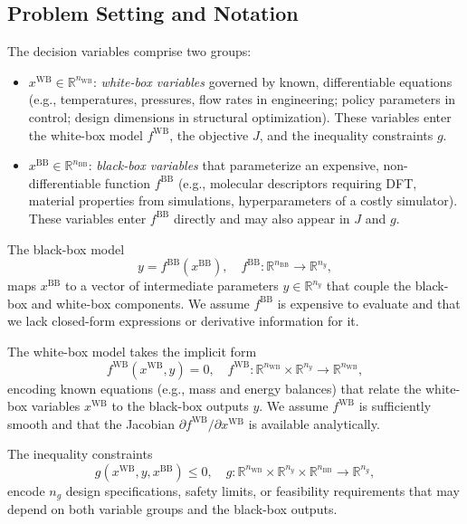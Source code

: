 \documentclass[12pt,a4paper]{article}%
\theoremstyle{plain}%
\theoremstyle{remark}%
\theoremstyle{definition}%
\def\WB{\mathrm{WB}}
\def\BB{\mathrm{BB}}
\begin{document}
\subsection{Problem Setting and Notation}\label{subsec:problem_setting}

The decision variables comprise two groups:
\begin{itemize}
    \item $x^{\WB} \in \mathbb{R}^{n_{\WB}}$: \emph{white-box variables} governed by known, differentiable equations (e.g., temperatures, pressures, flow rates in engineering; policy parameters in control; design dimensions in structural optimization). These variables enter the white-box model $f^{\WB}$, the objective $J$, and the inequality constraints $g$.
    \item $x^{\BB} \in \mathbb{R}^{n_{\BB}}$: \emph{black-box variables} that parameterize an expensive, non-differentiable function $f^{\BB}$ (e.g., molecular descriptors requiring DFT, material properties from simulations, hyperparameters of a costly simulator). These variables enter $f^{\BB}$ directly and may also appear in $J$ and $g$.
\end{itemize}

The black-box model
\begin{equation}\label{eq:molecular_model}
    y = f^{\BB}(x^{\BB}), \quad f^{\BB}: \mathbb{R}^{n_{\BB}} \to \mathbb{R}^{n_y},
\end{equation}
maps $x^{\BB}$ to a vector of intermediate parameters $y \in \mathbb{R}^{n_y}$ that couple the black-box and white-box components. We assume $f^{\BB}$ is expensive to evaluate and that we lack closed-form expressions or derivative information for it.

The white-box model takes the implicit form
\begin{equation}\label{eq:process_model}
    f^{\WB}(x^{\WB}, y) = 0, \quad f^{\WB}: \mathbb{R}^{n_{\WB}} \times \mathbb{R}^{n_y} \to \mathbb{R}^{n_{\WB}},
\end{equation}
encoding known equations (e.g., mass and energy balances) that relate the white-box variables $x^{\WB}$ to the black-box outputs $y$. We assume $f^{\WB}$ is sufficiently smooth and that the Jacobian $\partial f^{\WB}/\partial x^{\WB}$ is available analytically.

The inequality constraints
\begin{equation}\label{eq:g_definition}
    g(x^{\WB}, y, x^{\BB}) \leq 0, \quad g: \mathbb{R}^{n_{\WB}} \times \mathbb{R}^{n_y} \times \mathbb{R}^{n_{\BB}} \to \mathbb{R}^{n_g},
\end{equation}
encode $n_g$ design specifications, safety limits, or feasibility requirements that may depend on both variable groups and the black-box outputs.
\end{document}
